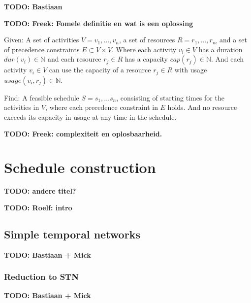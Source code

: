 \documentclass{article}
\newcommand{\TODO}[1]{{\color{red}\textbf{TODO: #1}}}
\newcommand{\capa}[1]{\ensuremath{cap(r_{#1})}} %
\newcommand{\dur}[1]{\ensuremath{dur(v_{#1})}} %
\newcommand{\usage}[2]{\ensuremath{usage(v_{#1}, r_{#2})}} %
\newenvironment{definition}[1][Definition]{\begin{trivlist}
\item[\hskip \labelsep {\bfseries #1}]}{\end{trivlist}}
\begin{document}
\TODO{Bastiaan}


\TODO{Freek: Fomele definitie en wat is een oplossing}

\begin{definition}
Given:
A set of activities $V = v_1, \ldots, v_n$, a set of resources $R = r_1, \ldots, r_m$ and a set of precedence constraints $E \subset V \times V$.
Where each activity $v_i \in V$ has a duration $\dur{i} \in \mathbb{N}$ and each resource $r_j \in R$ has a capacity $\capa{j} \in \mathbb{N}$. 
And each activity $v_i \in V$ can use the capacity of a resource $r_j \in R$ with usage $\usage{i}{j} \in \mathbb{N}$.

Find:
A feasible schedule $S = s_1, \ldots s_n$, consisting of starting times for the activities in $V$, where each precedence constraint in $E$ holds.
And no resource exceeds its capacity in usage at any time in the schedule.
\end{definition}


\TODO{Freek: complexiteit en oplosbaarheid.}


\newpage


\section{Schedule construction} \TODO{andere titel?}

\TODO{Roelf: intro}

\subsection{Simple temporal networks}

\TODO{Bastiaan + Mick}


\subsubsection{Reduction to STN}

\TODO{Bastiaan + Mick}
\end{document}
